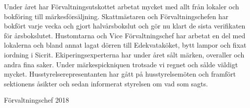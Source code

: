\documentclass[../_main/handlingar.tex]{subfiles}
\begin{document}

Under året har Förvaltningsutskottet arbetat mycket med allt från lokaler och bokföring till
märkesförsäljning. Skattmästaren och Förvaltningschefen har bokfört varje vecka och gjort
halvårsbokslut och gör nu klart de sista verifikaten för årsbokslutet. Hustomtarna och Vice
Förvaltningschef har arbetat en del med lokalerna och bland annat lagat dörren till
Edekvataköket, bytt lampor och fixat iordning i Sicrit. Ekiperingsexperterna har under året
sålt märken, overaller och andra fina saker. Under märkespickniquen trotsade vi regnet och
sålde väldigt mycket. Husstyrelserepresentanten har gått på husstyrelsemöten och framfört
sektionens åsikter och sedan informerat styrelsen om vad som sagts.


\begin{signatures}{1}
    \mvh
    \signature{Magnus Lundh}{Förvaltningschef 2018}
\end{signatures}
\end{document}
